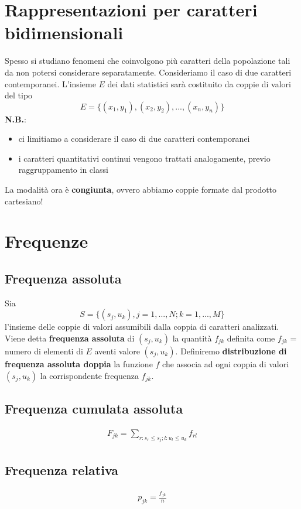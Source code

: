\section{Rappresentazioni per caratteri bidimensionali}
Spesso si studiano fenomeni che coinvolgono più caratteri della popolazione tali da non potersi considerare separatamente. \newline
Consideriamo il caso di due caratteri contemporanei. L'insieme $E$ dei dati statistici sarà costituito da coppie di valori del tipo \[ E = \{(x_1, y_1), (x_2, y_2), ..., (x_n, y_n)\}\]
\textbf{N.B.}: 
\begin{itemize}
	\item ci limitiamo a considerare il caso di due caratteri contemporanei
	\item i caratteri quantitativi continui vengono trattati analogamente, previo raggruppamento in classi
\end{itemize}	
La modalità ora è \textbf{congiunta}, ovvero abbiamo coppie formate dal prodotto cartesiano!\newline


\section{Frequenze}
\subsection{Frequenza assoluta}
Sia
\[	S = \{(s_j, u_k), j = 1, ..., N; k = 1, ..., M \} \]
l'insieme delle coppie di valori assumibili dalla coppia di caratteri analizzati.
Viene detta \textbf{frequenza assoluta} di $(s_j, u_k)$ la quantità $f_{jk}$ definita come \newline $f_{jk}$ = numero di elementi di $E$ aventi valore $(s_j, u_k)$. \newline
Definiremo \textbf{distribuzione di frequenza assoluta doppia} la funzione $f$ che associa ad ogni coppia di valori $(s_j, u_k)$ la corrispondente frequenza $f_{jk}$.

\subsection{Frequenza cumulata assoluta}
\begin{align}
F_{jk} = \sum_{r: s_r \leq s_j; l: u_l \leq u_k} f_{rl}
\end{align}

\subsection{Frequenza relativa}
\begin{align}
p_{jk} = \frac{f_{jk}}{n}
\end{align}

